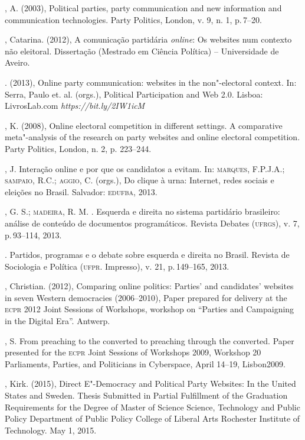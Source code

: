 \begin{bibliohedra}
, A. (2003), Political parties, party communication and new
information and communication technologies. Party Politics, London, v.
9, n. 1, p.\,7--20.

, Catarina. (2012), A comunicação partidária \emph{\emph{online}}: Os websites
num contexto não eleitoral. Dissertação (Mestrado em Ciência Política)
-- Universidade de Aveiro.

\titidem. (2013), Online party communication: websites in the
non"-electoral context. In: Serra, Paulo et. al. (orgs.), Political
Participation and Web 2.0. Lisboa: LivrosLab.com
\emph{https://bit.ly/2IW1icM}

, K. (2008), Online electoral competition in different
settings. A comparative meta"-analysis of the research on party websites
and online electoral competition. Party Politics, London, n. 2, p.
223--244.

, J. Interação online e por que os candidatos a evitam.
In: \textsc{marques}, F.P.J.A.; \textsc{sampaio}, R.C.; \textsc{aggio}, C. (orgs.), Do clique à
urna: Internet, redes sociais e eleições no Brasil. Salvador: \textsc{edufba},
2013.

, G. S.; \textsc{madeira}, R. M. . Esquerda e direita no sistema
partidário brasileiro: análise de conteúdo de documentos programáticos.
Revista Debates (\textsc{ufrgs}), v. 7, p.\,93--114, 2013.

\titidem. Partidos, programas e o debate sobre
esquerda e direita no Brasil. Revista de Sociologia e Política (\textsc{ufpr}.
Impresso), v. 21, p.\,149--165, 2013.

, Christian. (2012), Comparing online politics: Parties' and
candidates' websites in seven Western democracies (2006--2010), Paper
prepared for delivery at the \textsc{ecpr} 2012 Joint Sessions of Workshops,
workshop on ``Parties and Campaigning in the Digital Era''. Antwerp.

, S. From preaching to the converted to preaching through the
converted. Paper presented for the \textsc{ecpr} Joint Sessions of Workshops
2009, Workshop 20 Parliaments, Parties, and Politicians in Cyberspace,
April 14--19, Lisbon2009.

, Kirk. (2015), Direct E"-Democracy and Political Party Websites:
In the United States and Sweden. Thesis Submitted in Partial Fulfillment
of the Graduation Requirements for the Degree of Master of Science
Science, Technology and Public Policy Department of Public Policy
College of Liberal Arts Rochester Institute of Technology. May 1, 2015.


\end{bibliohedra}
